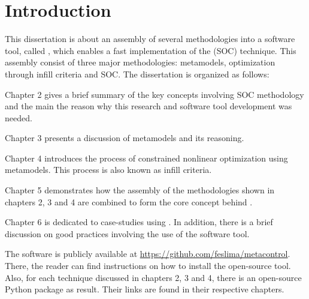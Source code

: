 \documentclass[../msc-thesis.tex]{subfiles}
\begin{document}
\chapter{Introduction}

This dissertation is about an assembly of several methodologies into a software 
tool, called \mtc, which enables a fast implementation of the \soc (SOC) 
technique. This assembly consist of three major methodologies: \kriging 
metamodels, optimization through infill criteria and SOC. The dissertation is 
organized as follows:

Chapter 2 gives a brief summary of the key concepts involving SOC methodology 
and the main the reason why this research and software tool development was 
needed.

Chapter 3 presents a discussion of \kriging metamodels and its reasoning.

Chapter 4 introduces the process of constrained nonlinear optimization using 
\kriging metamodels. This process is also known as infill criteria.

Chapter 5 demonstrates how the assembly of the methodologies shown in chapters 
2, 3 and 4 are combined to form the core concept behind \mtc.

Chapter 6 is dedicated to case-studies using \mtc. In addition, there is a 
brief discussion on good practices involving the use of the software tool.

The \mtc software is publicly available at 
\url{https://github.com/feslima/metacontrol}. There, the reader can find 
instructions on how to install the open-source tool. Also, for each technique 
discussed in chapters 2, 3 and 4, there is an open-source Python package as 
result. Their links are found in their respective chapters.
\end{document}
